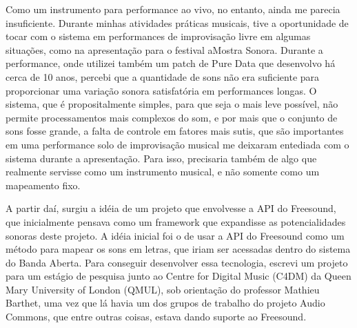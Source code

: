 Como um instrumento para performance ao vivo, no entanto, ainda me parecia insuficiente. Durante minhas atividades práticas musicais, tive a oportunidade de tocar com o sistema em performances de improvisação livre em algumas situações, como na apresentação para o festival aMostra Sonora. Durante a performance, onde utilizei também um patch de Pure Data que desenvolvo há cerca de 10 anos, percebi que a quantidade de sons não era suficiente para proporcionar uma variação sonora satisfatória em performances longas. O sistema, que é propositalmente simples, para que seja o mais leve possível, não permite processamentos mais complexos do som, e por mais que o conjunto de sons fosse grande, a falta de controle em fatores mais sutis, que são importantes em uma performance solo de improvisação musical me deixaram entediada com o sistema durante a apresentação. Para isso, precisaria também de algo que realmente servisse como um instrumento musical, e não somente como um mapeamento fixo. 

A partir daí, surgiu a idéia de um projeto que envolvesse a API do Freesound, que inicialmente pensava como um framework que expandisse as potencialidades sonoras deste projeto. A idéia inicial foi o de usar a API do Freesound como um método para mapear os sons em letras, que iriam ser acessadas dentro do sistema do Banda Aberta. Para conseguir desenvolver essa tecnologia, escrevi um projeto para um estágio de pesquisa junto ao Centre for Digital Music (C4DM) da Queen Mary University of London (QMUL),  sob orientação do professor Mathieu Barthet, uma vez que lá havia um dos grupos de trabalho do projeto Audio Commons, que entre outras coisas, estava dando suporte ao Freesound. 








